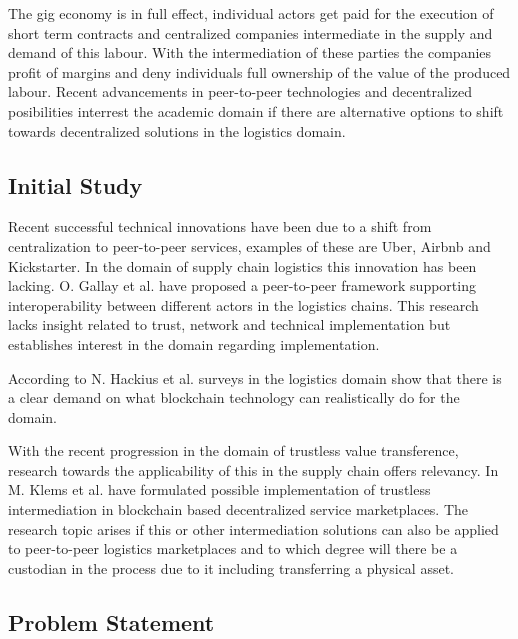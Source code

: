 The gig economy is in full effect, individual actors get paid for the execution of short term contracts and centralized companies intermediate in the supply and demand of this labour. With the intermediation of these parties the companies profit of margins and deny individuals full ownership of the value of the produced labour. Recent advancements in peer-to-peer technologies and decentralized posibilities interrest the academic domain if there are alternative options to shift towards decentralized solutions in the logistics domain.\par

\subsection{Initial Study}

Recent successful technical innovations have been due to a shift from centralization to peer-to-peer services, examples of these are Uber, Airbnb and Kickstarter. In the domain of supply chain logistics this innovation has been lacking. O. Gallay et al. \cite{peer-to-peerDecentralizedLogistics} have proposed a peer-to-peer framework supporting interoperability between different actors in the logistics chains. This research lacks insight related to trust, network and technical implementation but establishes interest in the domain regarding implementation. \par
According to N. Hackius et al. \cite{hackius2017blockchain} surveys in the logistics domain show that there is a clear demand on what blockchain technology can realistically do for the domain. \par
With the recent progression in the domain of trustless value transference, research towards the applicability of this in the supply chain offers relevancy. In \cite{trustlessIntermediationInBCServiceMarket} M. Klems et al. have formulated possible implementation of trustless intermediation in blockchain based decentralized service marketplaces. The research topic arises if this or other intermediation solutions can also be applied to peer-to-peer logistics marketplaces and to which degree will there be a custodian in the process due to it including transferring a physical asset.

\subsection{Problem Statement}

